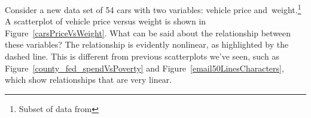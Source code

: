 \begin{doublespace}
\begin{example}{Consider a new data set of 54 cars with two variables: vehicle price and~weight.\footnote{Subset of data from } A scatterplot of vehicle price versus weight is shown in Figure~\ref{carsPriceVsWeight}. What can be said about the relationship between these variables?}
The relationship is evidently nonlinear, as highlighted by the dashed line. This is different from previous scatterplots we've seen, such as Figure~\vref{county_fed_spendVsPoverty} and Figure~\ref{email50LinesCharacters}, which show relationships that are very linear.
\end{example}

\end{doublespace}
